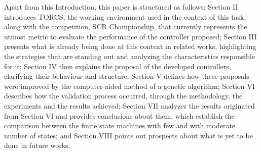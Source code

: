 	Apart from this Introduction, this paper is structured as follows: Section II introduces TORCS, the working
	environment used in the context of this task, along with the competition, SCR Championship, that currently
	represents the utmost metric to evaluate the performance of the controller proposed; Section III presents what is
	already being done at this context in related works, highlighting the strategies that are standing out and
	analyzing the characteristics responsible for it; Section IV then explains the proposal of the developed
	controllers, clarifying their behaviour and structure; Section V defines how these proposals were improved by the
	computer-aided method of a genetic algorithm; Section VI describes how the validation process occurred, through
	the methodology, the experiments and the results achieved; Section VII analyzes the results originated from
	Section VI and provides conclusions about them, which establish the comparison between the finite state machines
	with few and with moderate number of states; and Section VIII points out prospects about what is yet to be done
	in future works.



